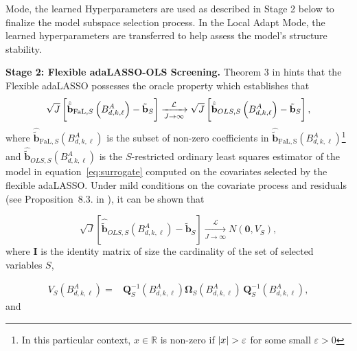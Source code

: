 \documentclass[10pt,a4paper,oneside]{article}
\newcommand{\R}{\mathbb{R}}
\DeclarePairedDelimiter{\aval}{\lvert}{\rvert} %
\providecommand{\DIFaddtex}[1]{{\protect\color{blue}\uwave{#1}}} %
\providecommand{\DIFaddend}{} %
\providecommand{\DIFdelbegin}{} %
\providecommand{\DIFdelend}{} %
\providecommand{\DIFadd}[1]{\texorpdfstring{\DIFaddtex{#1}}{#1}} %
\newcommand{\DIFscaledelfig}{0.5}
\newlength{\DIFdelgraphicswidth} %
\newlength{\DIFdelgraphicsheight} %
\newcommand{\DIFdelincludegraphics}[2][]{%
\sbox{\DIFdelgraphicsbox}{\DIFOincludegraphics[#1]{#2}}%
\settoboxwidth{\DIFdelgraphicswidth}{\DIFdelgraphicsbox} %
\settoboxtotalheight{\DIFdelgraphicsheight}{\DIFdelgraphicsbox} %
\scalebox{\DIFscaledelfig}{%
\parbox[b]{\DIFdelgraphicswidth}{\usebox{\DIFdelgraphicsbox}\\[-\baselineskip] \rule{\DIFdelgraphicswidth}{0em}}\llap{\resizebox{\DIFdelgraphicswidth}{\DIFdelgraphicsheight}{%
\setlength{\unitlength}{\DIFdelgraphicswidth}%
\begin{picture}(1,1)%
\thicklines\linethickness{2pt} %
{\color[rgb]{1,0,0}\put(0,0){\framebox(1,1){}}}%
{\color[rgb]{1,0,0}\put(0,0){\line( 1,1){1}}}%
{\color[rgb]{1,0,0}\put(0,1){\line(1,-1){1}}}%
\end{picture}%
}\hspace*{3pt}}} %
} %
\DeclareRobustCommand{\DIFaddend}{\DIFOaddend \let\includegraphics\DIFOincludegraphics} %
\DeclareRobustCommand{\DIFdelbegin}{\DIFOdelbegin \let\includegraphics\DIFdelincludegraphics} %
\DeclareRobustCommand{\DIFdelend}{\DIFOaddend \let\includegraphics\DIFOincludegraphics} %
\begin{document}
\DIFadd{In the Global Retrain }\DIFaddend Mode, the learned Hyperparameters are used as described in Stage 2 below to finalize the model subspace selection process. In the Local Adapt Mode, the learned hyperparameters are transferred to help assess the model's structure stability.
\DIFdelbegin %

\DIFdelend \medskip

\noindent\textbf{Stage 2: Flexible adaLASSO-OLS Screening.} Theorem 3 in \cite{MEDEIROS2016255} hints that the Flexible adaLASSO possesses the oracle property which establishes that
$$
    \sqrt{J} \left[\hat{\tilde{\mathbf{b}}}_{\mathrm{FaL},S} \left( B^A_{d, k, \ell} \right) - \tilde{\mathbf{b}}_S \right] \xrightarrow[J \rightarrow \infty]{\mathcal{L}}\\ \sqrt{J} \left[\hat{\tilde{\mathbf{b}}}_{OLS, S} \left( B^A_{d, k, \ell} \right) - \tilde{\mathbf{b}}_S\right],
$$
where $\hat{\tilde{\mathbf{b}}}_{\mathrm{FaL},S}\left( B^A_{d, k, \ell} \right)$ is the subset of non-zero coefficients in $\hat{\tilde{\mathbf{b}}}_{\mathrm{FaL,S}}\left( B^A_{d, k, \ell} \right)$\footnote{In this particular context, $x \in \R$ is non-zero if $\aval{x} > \varepsilon$ for some small $\varepsilon > 0$} and $\hat{\tilde{\mathbf{b}}}_{OLS, S}\left( B^A_{d, k, \ell} \right)$ is the $S$-restricted ordinary least squares estimator of the model in equation~\eqref{eq:surrogate} computed on the covariates selected by the flexible adaLASSO. Under mild conditions on the covariate process and residuals (see Proposition~8.3. in \cite{hamilton_time_1994}), it can be shown that

$$
    \sqrt{J}\left[\hat{\tilde{\mathbf{b}}}_{OLS,S} \left( B^A_{d, k, \ell} \right) - \tilde{\mathbf{b}}_S \right]  \xrightarrow[J \rightarrow \infty]{\mathcal{L}} N(\mathbf{0}, V_S),
$$
where $\mathbf{I}$ is the identity matrix of size the cardinality of the set of selected variables $S$,

\begin{align*}
    V_{S} \left( B^A_{d, k, \ell} \right)
    ={} &
    \mathbf{Q}^{-1}_S\left(B^A_{d,k,\ell}\right)\mathbf{\Omega}_S\left(B^A_{d,k,\ell}\right) \, \mathbf{Q}^{-1}_S\left(B^A_{d,k,\ell}\right),
\end{align*}
and
\end{document}
